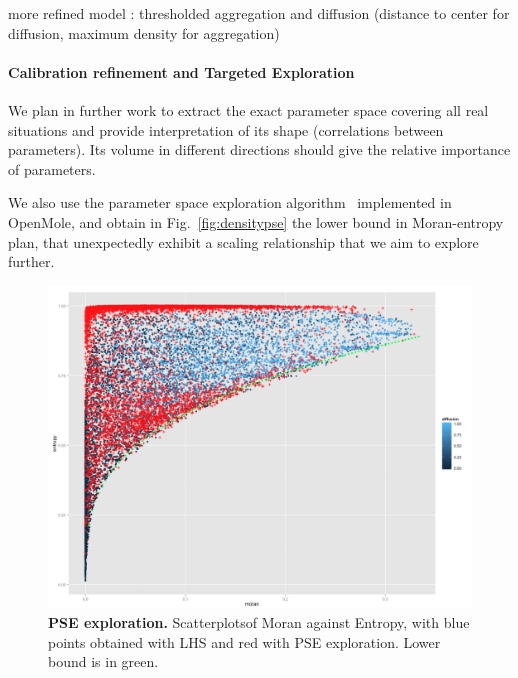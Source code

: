 \documentclass[10pt,letterpaper,draft]{article}
\begin{document}
more refined model : thresholded aggregation and diffusion (distance to center for diffusion, maximum density for aggregation)

\paragraph{Calibration refinement and Targeted Exploration}

We plan in further work to extract the exact parameter space covering all real situations and provide interpretation of its shape (correlations between parameters). Its volume in different directions should give the relative importance of parameters.




We also use the parameter space exploration algorithm~\cite{10.1371/journal.pone.0138212} implemented in OpenMole, and obtain in Fig.~\ref{fig:densitypse} the lower bound in Moran-entropy plan, that unexpectedly exhibit a scaling relationship that we aim to explore further.

\begin{figure}
\includegraphics[width=\textwidth]{figures/Fig6.png}
\caption{\textbf{PSE exploration.} Scatterplotsof Moran against Entropy, with blue points obtained with LHS and red with PSE exploration. Lower bound is in green.}
\label{fig:fig5}
\end{figure}



\end{document}
